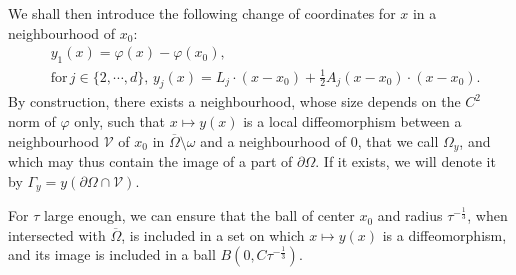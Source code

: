 \documentclass[AHL,Unicode,longabstracts]{cedram}
\newcommand{\clV}{\mathcal{V}}
\begin{document}
We shall then introduce the following change of coordinates for $x$ in a neighbourhood of $x_0$:
\begin{align*}
& y_1(x) = \varphi(x)- \varphi(x_0),
\\
& \text{for} \, j \in \{2, \cdots, d\},
\, y_j(x) = L_j \cdot (x-x_0) + \frac{1}{2} A_j (x-x_0) \cdot (x-x_0).
\end{align*}
By construction, there exists a neighbourhood, whose size depends on the $C^2$ norm of $\varphi$ only, such that $x \mapsto y(x)$ is a local diffeomorphism between a neighbourhood $\clV$ of $x_0$ in $\overline\Omega\setminus \omega$ and a neighbourhood of $0$, that we call $\Omega_y$, and which may thus contain the image of a part of $\partial \Omega$. If it exists, we will denote it by $\Gamma_y = y(\partial \Omega \cap \clV)$.

For $\tau$ large enough, we can ensure that the ball of center $x_0$ and radius $\tau^{-\frac{1}{3}}$, when intersected with $\overline\Omega$, is included in a set on which $x \mapsto y(x)$ is a diffeomorphism, and its image is included in a ball $B(0, C \tau^{-\frac{1}{3}})$.
\end{document}
